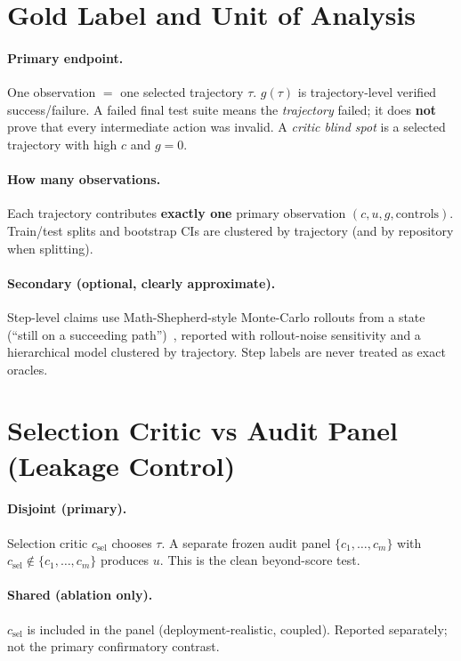 \documentclass[11pt]{article}
\newcommand{\gzero}{g{=}0}
\begin{document}
\section{Gold Label and Unit of Analysis}

\paragraph{Primary endpoint.}
One observation $=$ one selected trajectory $\tau$.
$g(\tau)$ is trajectory-level verified success/failure.
A failed final test suite means the \emph{trajectory} failed; it does \textbf{not} prove that every intermediate action was invalid.
A \emph{critic blind spot} is a selected trajectory with high $c$ and $\gzero$.

\paragraph{How many observations.}
Each trajectory contributes \textbf{exactly one} primary observation $(c,u,g,\mathrm{controls})$.
Train/test splits and bootstrap CIs are clustered by trajectory (and by repository when splitting).

\paragraph{Secondary (optional, clearly approximate).}
Step-level claims use Math-Shepherd-style Monte-Carlo rollouts from a state (``still on a succeeding path'')~\cite{mathshepherd}, reported with rollout-noise sensitivity and a hierarchical model clustered by trajectory.
Step labels are never treated as exact oracles.

\section{Selection Critic vs Audit Panel (Leakage Control)}

\paragraph{Disjoint (primary).}
Selection critic $c_{\mathrm{sel}}$ chooses $\tau$.
A separate frozen audit panel $\{c_1,\ldots,c_m\}$ with $c_{\mathrm{sel}}\notin\{c_1,\ldots,c_m\}$ produces $u$.
This is the clean beyond-score test.

\paragraph{Shared (ablation only).}
$c_{\mathrm{sel}}$ is included in the panel (deployment-realistic, coupled).
Reported separately; not the primary confirmatory contrast.
\end{document}
